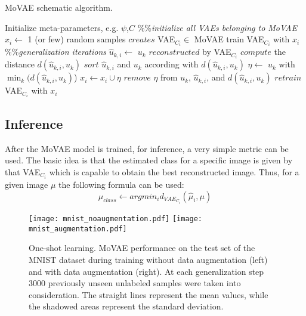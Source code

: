 \documentclass[sigconf,authorversion=true]{aamas}  %
\begin{document}
\begin{algorithm}
\caption{MoVAE schematic algorithm.}
\begin{algorithmic}[1]
\State Initialize meta-parameters, e.g. $\psi$,$C$
\State \%\%\textit{initialize all VAEs belonging to MoVAE}
\State $x_i\gets$ 1 (or few) random samples
\State $creates$ VAE$_{C_i}\in$ MoVAE
\State train VAE$_{C_i}$ with $x_i$
\EndFor
\State \%\%\textit{generalization iterations}
  \State $\widehat{u}_{k,i}\gets$ $u_k$ $reconstructed$ by VAE$_{C_i}$
  \State $compute$ the distance $d(\widehat{u}_{k,i},u_k)$
  \EndFor
  \State $sort$ $\widehat{u}_{k,i}$ and $u_k$ according with $d(\widehat{u}_{k,i},u_k)$
\EndFor
{}
\State $\eta\gets$ $u_k$ with $\min_k(d(\widehat{u}_{k,i},u_k)$)
\State $x_i\gets x_i\cup\eta$
\State $remove$ $\eta$ from $u_k$, $\widehat{u}_{k,i}$, and $d(\widehat{u}_{k,i},u_k)$
\EndIf
\EndFor
\EndFor
{}
\State $retrain$ VAE$_{C_i}$ with $x_i$
\EndFor
\EndFor
\end{algorithmic}
\label{alg:dbntrain}
\end{algorithm}\subsection{Inference}
After the MoVAE model is trained, for inference, a very simple metric can be used. The basic idea is that the estimated class for a specific image is given by that VAE$_{C_i}$ which is capable to obtain the best reconstructed image. Thus, for a given image $\mu$ the following formula can be used:
\begin{equation}
 \mu_{class}\gets argmin_{i} d_{VAE_{C_i}}(\widehat{\mu}_{i},\mu)
\end{equation}\begin{figure*}[t!]
\centering
\texttt{[image: mnist\_noaugmentation.pdf]}
\texttt{[image: mnist\_augmentation.pdf]}
\caption{One-shot learning. MoVAE performance on the test set of the MNIST dataset during training without data augmentation (left) and with data augmentation (right). At each generalization step 3000 previously unseen unlabeled samples were taken into consideration. The straight lines represent the mean values, while the shadowed areas represent the standard deviation.}
\label{fig:mnistoneshot}
\end{figure*}
\end{document}
